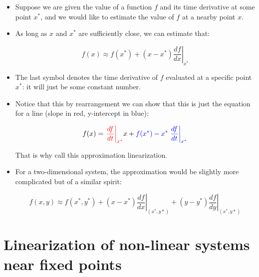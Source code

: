 \documentclass{article}
\begin{document}
\begin{itemize}

\item Suppose we are given the value of a function $f$ and its time derivative at some point $x^*$, and we would like to estimate the value of $f$ at a nearby point $x$.

\item As long as $x$ and $x^*$ are sufficiently close, we can estimate that:

\[ f(x) \approx f(x^*) + \left( x - x^* \right) \left. \frac{df}{dx} \right|_{x^*} \]

\item The last symbol denotes the time derivative of $f$ evaluated at a specific point $x^*$: it will  just be some constant number.

\item Notice that this by rearrangement we can show that this is just the equation for a line (slope in red, y-intercept in blue):

\[ f(x) = {\color{red} \left. \frac{df}{dt} \right|_{x^*}} x + {\color{blue} f(x^*) - x^* \left. \frac{df}{dt} \right|_{x^*} } \]

That is why call this approximation linearization.

\item For a two-dimensional system, the approximation would be slightly more complicated but of a similar spirit:

\[ f(x,y) \approx f(x^*,y^*) + \left( x - x^* \right) \left. \frac{df}{dx} \right|_{(x^*,y*)} + \left( y - y^* \right) \left. \frac{df}{dy} \right|_{(x^*,y*)}  \]

\end{itemize}

\section*{Linearization of non-linear systems near fixed points}
\end{document}
